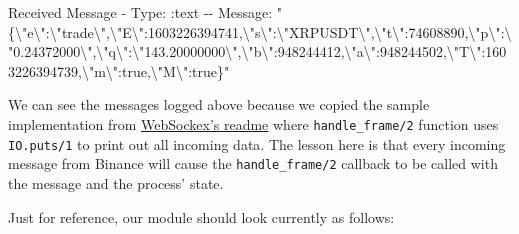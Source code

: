 \documentclass[
  oneside]{book}
\newenvironment{Shaded}{\begin{snugshade}}{\end{snugshade}}
\newcommand{\AttributeTok}[1]{\textcolor[rgb]{0.77,0.63,0.00}{#1}}
\newcommand{\DataTypeTok}[1]{\textcolor[rgb]{0.13,0.29,0.53}{#1}}
\newcommand{\ExtensionTok}[1]{#1}
\newcommand{\NormalTok}[1]{#1}
\newcommand{\StringTok}[1]{\textcolor[rgb]{0.31,0.60,0.02}{#1}}
\begin{document}
\begin{Shaded}
\begin{Highlighting}[]
\ExtensionTok{Received}\NormalTok{ Message }\AttributeTok{{-}}\NormalTok{ Type: :text }\AttributeTok{{-}{-}}\NormalTok{ Message: }\StringTok{"\{}\DataTypeTok{\textbackslash{}"}\StringTok{e}\DataTypeTok{\textbackslash{}"}\StringTok{:}\DataTypeTok{\textbackslash{}"}\StringTok{trade}\DataTypeTok{\textbackslash{}"}\StringTok{,}\DataTypeTok{\textbackslash{}"}\StringTok{E}\DataTypeTok{\textbackslash{}"}\StringTok{:1603226394741,}\DataTypeTok{\textbackslash{}"}\StringTok{s}\DataTypeTok{\textbackslash{}"}\StringTok{:}\DataTypeTok{\textbackslash{}"}\StringTok{XRPUSDT}\DataTypeTok{\textbackslash{}"}\StringTok{,}\DataTypeTok{\textbackslash{}"}\StringTok{t}\DataTypeTok{\textbackslash{}"}\StringTok{:74608890,}\DataTypeTok{\textbackslash{}"}\StringTok{p}\DataTypeTok{\textbackslash{}"}\StringTok{:}\DataTypeTok{\textbackslash{}"}\StringTok{0.24372000}\DataTypeTok{\textbackslash{}"}\StringTok{,}\DataTypeTok{\textbackslash{}"}\StringTok{q}\DataTypeTok{\textbackslash{}"}\StringTok{:}\DataTypeTok{\textbackslash{}"}\StringTok{143.20000000}\DataTypeTok{\textbackslash{}"}\StringTok{,}\DataTypeTok{\textbackslash{}"}\StringTok{b}\DataTypeTok{\textbackslash{}"}\StringTok{:948244412,}\DataTypeTok{\textbackslash{}"}\StringTok{a}\DataTypeTok{\textbackslash{}"}\StringTok{:948244502,}\DataTypeTok{\textbackslash{}"}\StringTok{T}\DataTypeTok{\textbackslash{}"}\StringTok{:1603226394739,}\DataTypeTok{\textbackslash{}"}\StringTok{m}\DataTypeTok{\textbackslash{}"}\StringTok{:true,}\DataTypeTok{\textbackslash{}"}\StringTok{M}\DataTypeTok{\textbackslash{}"}\StringTok{:true\}"}
\end{Highlighting}
\end{Shaded}

We can see the messages logged above because we copied the sample implementation from \href{https://github.com/Azolo/websockex}{WebSockex's readme} where \texttt{handle\_frame/2} function uses \texttt{IO.puts/1} to print out all incoming data. The lesson here is that every incoming message from Binance will cause the \texttt{handle\_frame/2} callback to be called with the message and the process' state.

Just for reference, our module should look currently as follows:
\end{document}
